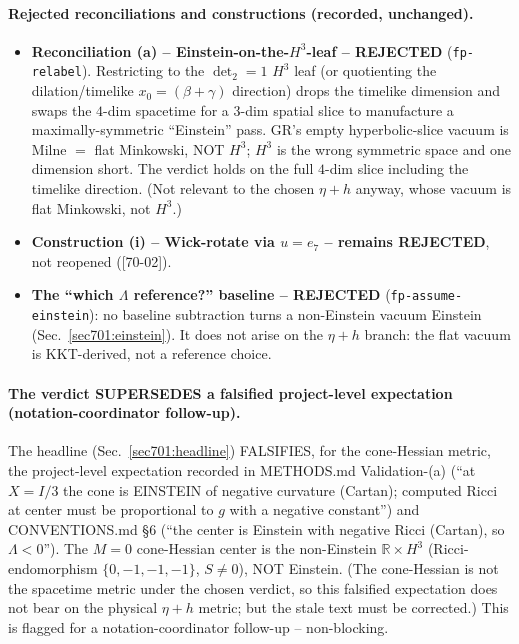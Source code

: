 \paragraph{Rejected reconciliations and constructions (recorded, unchanged).}
\begin{itemize}
  \item \textbf{Reconciliation (a) -- Einstein-on-the-$H^3$-leaf -- REJECTED}
        (\texttt{fp-relabel}). Restricting to the $\det_2=1$ $H^3$ leaf (or quotienting the
        dilation/timelike $x_0=(\beta+\gamma)$ direction) drops the timelike dimension and
        swaps the $4$-dim spacetime for a $3$-dim spatial slice to manufacture a
        maximally-symmetric ``Einstein'' pass. GR's empty hyperbolic-slice vacuum is
        Milne $=$ flat Minkowski, NOT $H^3$; $H^3$ is the wrong symmetric space and one
        dimension short. The verdict holds on the full $4$-dim slice including the timelike
        direction. (Not relevant to the chosen $\eta+h$ anyway, whose vacuum is flat
        Minkowski, not $H^3$.)
  \item \textbf{Construction (i) -- Wick-rotate via $u=e_7$ -- remains REJECTED}, not
        reopened ([70-02]).
  \item \textbf{The ``which $\Lambda$ reference?'' baseline -- REJECTED}
        (\texttt{fp-assume-einstein}): no baseline subtraction turns a non-Einstein vacuum
        Einstein (Sec.~\ref{sec701:einstein}). It does not arise on the $\eta+h$ branch:
        the flat vacuum is KKT-derived, not a reference choice.
\end{itemize}

\paragraph{The verdict SUPERSEDES a falsified project-level expectation
(notation-coordinator follow-up).} The headline (Sec.~\ref{sec701:headline}) FALSIFIES, for
the cone-Hessian metric, the project-level expectation recorded in METHODS.md
Validation-(a) (``at $X=I/3$ the cone is EINSTEIN of negative curvature (Cartan); computed
Ricci at center must be proportional to $g$ with a negative constant'') and CONVENTIONS.md
\S6 (``the center is Einstein with negative Ricci (Cartan), so $\Lambda<0$''). The
$M=0$ cone-Hessian center is the non-Einstein $\mathbb{R}\times H^3$ (Ricci-endomorphism
$\{0,-1,-1,-1\}$, $S\neq0$), NOT Einstein. (The cone-Hessian is not the spacetime metric
under the chosen verdict, so this falsified expectation does not bear on the physical
$\eta+h$ metric; but the stale text must be corrected.) This is flagged for a
notation-coordinator follow-up -- non-blocking.

